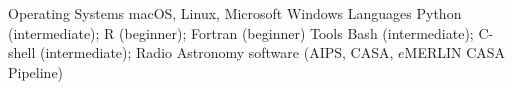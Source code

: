 \begin{cvskills}
  \cvskill
    {Operating Systems}
    {macOS, Linux, Microsoft Windows}
  \cvskill
  {Languages}
  {Python (intermediate); R (beginner); Fortran (beginner)}
  \cvskill
  {Tools}
  {Bash (intermediate); C-shell (intermediate); Radio Astronomy software (AIPS, CASA, $e$MERLIN CASA Pipeline)}
\end{cvskills}  